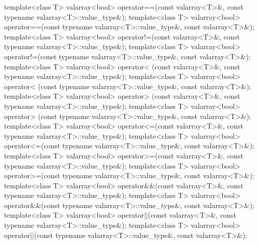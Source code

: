 %
%
%
%
%
%
%
%
\begin{itemdecl}
template<class T> valarray<bool> operator==(const valarray<T>&,
                                            const typename valarray<T>::value_type&);
template<class T> valarray<bool> operator==(const typename valarray<T>::value_type&,
                                            const valarray<T>&);
template<class T> valarray<bool> operator!=(const valarray<T>&,
                                            const typename valarray<T>::value_type&);
template<class T> valarray<bool> operator!=(const typename valarray<T>::value_type&,
                                            const valarray<T>&);
template<class T> valarray<bool> operator< (const valarray<T>&,
                                            const typename valarray<T>::value_type&);
template<class T> valarray<bool> operator< (const typename valarray<T>::value_type&,
                                            const valarray<T>&);
template<class T> valarray<bool> operator> (const valarray<T>&,
                                            const typename valarray<T>::value_type&);
template<class T> valarray<bool> operator> (const typename valarray<T>::value_type&,
                                            const valarray<T>&);
template<class T> valarray<bool> operator<=(const valarray<T>&,
                                            const typename valarray<T>::value_type&);
template<class T> valarray<bool> operator<=(const typename valarray<T>::value_type&,
                                            const valarray<T>&);
template<class T> valarray<bool> operator>=(const valarray<T>&,
                                            const typename valarray<T>::value_type&);
template<class T> valarray<bool> operator>=(const typename valarray<T>::value_type&,
                                            const valarray<T>&);
template<class T> valarray<bool> operator&&(const valarray<T>&,
                                            const typename valarray<T>::value_type&);
template<class T> valarray<bool> operator&&(const typename valarray<T>::value_type&,
                                            const valarray<T>&);
template<class T> valarray<bool> operator||(const valarray<T>&,
                                            const typename valarray<T>::value_type&);
template<class T> valarray<bool> operator||(const typename valarray<T>::value_type&,
                                            const valarray<T>&);
\end{itemdecl}


